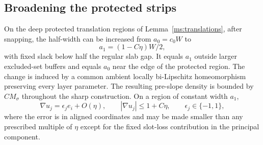 \subsection{Broadening the protected strips}

\begin{lemma}
\label{ms:broadening}
On the deep protected translation regions of
Lemma~\ref{ms:translations}, after snapping, the half-width can be
increased from $a_0=c_0W$ to
\begin{equation}
 a_1=(1-C\eta)W/2,
 \label{ms:wide-halfwidth}
\end{equation}
with fixed slack below half the regular slab gap.  It equals $a_1$
outside larger excluded-set buffers and equals $a_0$ near the edge
of the protected region.  The change is induced by a common
ambient locally bi-Lipschitz homeomorphism preserving every layer
parameter.  The resulting pre-slope density is bounded by
$CM_\sigma$ throughout the sharp construction.  On a region of
constant width $a_1$,
\begin{equation}
 \nabla u_j=\epsilon_j e_i+O(\eta),\qquad
 |\nabla u_j|\le1+C\eta,
 \qquad \epsilon_j\in\{-1,1\},
 \label{ms:sharp-scalar}
\end{equation}
where the error is in aligned coordinates and may be made smaller
than any prescribed multiple of $\eta$ except for the fixed
slot-loss contribution in the principal component.
\end{lemma}

